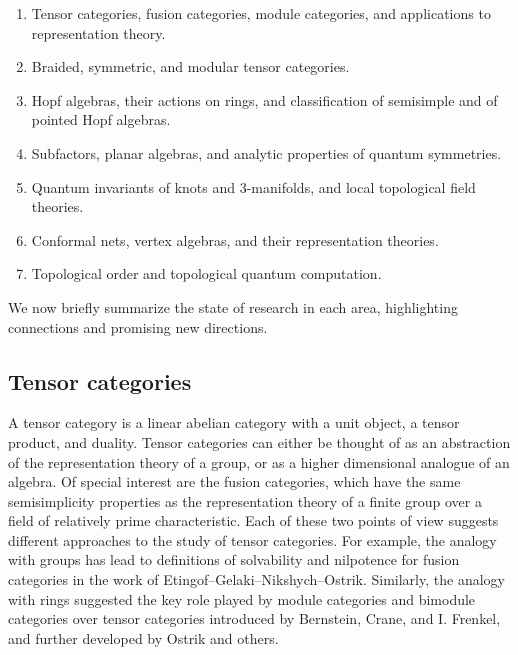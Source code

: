 \documentclass[12pt]{article}
\begin{document}
\begin{enumerate}
  \setlength{\itemsep}{1pt}
  \setlength{\parskip}{0pt}
  \setlength{\parsep}{0pt}
\item Tensor categories, fusion categories, module categories, and applications to representation theory.
\item Braided, symmetric, and modular tensor categories.
\item Hopf algebras, their actions on rings, and classification of semisimple and of pointed Hopf algebras.
\item Subfactors, planar algebras, and analytic properties of quantum symmetries.
\item Quantum invariants of knots and 3-manifolds, and local topological field theories.
\item Conformal nets, vertex algebras, and their representation theories.
\item Topological order and topological quantum computation.
\end{enumerate}

We now briefly summarize the state of research in each area, highlighting connections and promising new directions.

\subsection{Tensor categories}
A tensor category is a linear abelian category with a unit object, a tensor product, and duality. Tensor categories can either be thought of as an abstraction of the representation theory of a group, or as a higher dimensional analogue of an algebra. Of special interest are the fusion categories, which have the same semisimplicity properties as the representation theory of a finite group over a field of relatively prime characteristic.  Each of these two points of view suggests different approaches to the study of tensor categories. For example, the analogy with groups has lead to definitions of solvability and nilpotence for fusion categories in the work of Etingof--Gelaki--Nikshych--Ostrik.  Similarly, the analogy with rings suggested the key role played by module categories and bimodule categories over tensor categories introduced by Bernstein, Crane, and I. Frenkel, and further developed by Ostrik and others.
\end{document}

